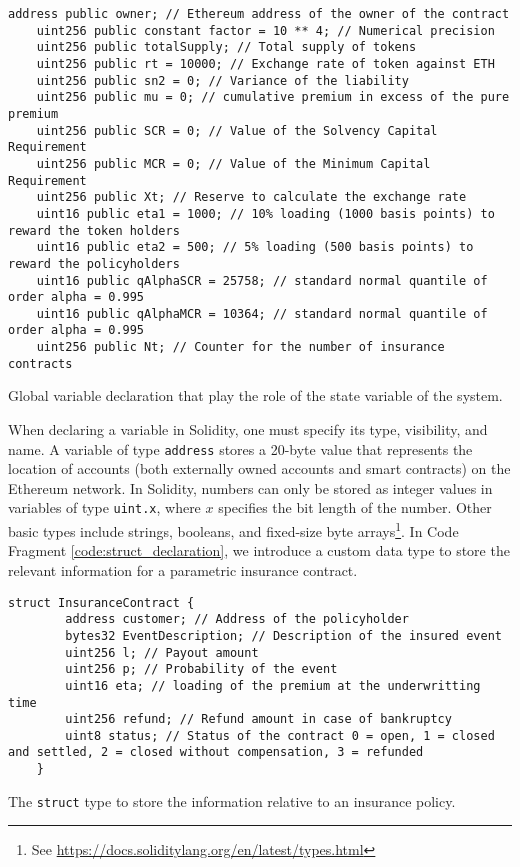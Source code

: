 \documentclass[10pt]{article}
\begin{document}
\begin{codefragment}[!h]
\begin{lstlisting}[language=Solidity]
    address public owner; // Ethereum address of the owner of the contract
    uint256 public constant factor = 10 ** 4; // Numerical precision
    uint256 public totalSupply; // Total supply of tokens
    uint256 public rt = 10000; // Exchange rate of token against ETH
    uint256 public sn2 = 0; // Variance of the liability
    uint256 public mu = 0; // cumulative premium in excess of the pure premium  
    uint256 public SCR = 0; // Value of the Solvency Capital Requirement
    uint256 public MCR = 0; // Value of the Minimum Capital Requirement
    uint256 public Xt; // Reserve to calculate the exchange rate
    uint16 public eta1 = 1000; // 10% loading (1000 basis points) to reward the token holders
    uint16 public eta2 = 500; // 5% loading (500 basis points) to reward the policyholders
    uint16 public qAlphaSCR = 25758; // standard normal quantile of order alpha = 0.995
    uint16 public qAlphaMCR = 10364; // standard normal quantile of order alpha = 0.995
    uint256 public Nt; // Counter for the number of insurance contracts
\end{lstlisting}
    \caption{Global variable declaration that play the role of the state variable of the system.}
    \label{code:variable_declaration}
\end{codefragment}
When declaring a variable in Solidity, one must specify its type, visibility, and name. A variable of type \texttt{address} stores a 20-byte value that represents the location of accounts (both externally owned accounts and smart contracts) on the Ethereum network. In Solidity, numbers can only be stored as integer values in variables of type \texttt{uint.x}, where \(x\) specifies the bit length of the number. Other basic types include strings, booleans, and fixed-size byte arrays\footnote{See \url{https://docs.soliditylang.org/en/latest/types.html}}. In Code Fragment \ref{code:struct_declaration}, we introduce a custom data type to store the relevant information for a parametric insurance contract.
\begin{codefragment}[!h]
\begin{lstlisting}[language=Solidity]
struct InsuranceContract {
        address customer; // Address of the policyholder
        bytes32 EventDescription; // Description of the insured event
        uint256 l; // Payout amount
        uint256 p; // Probability of the event
        uint16 eta; // loading of the premium at the underwritting time
        uint256 refund; // Refund amount in case of bankruptcy
        uint8 status; // Status of the contract 0 = open, 1 = closed and settled, 2 = closed without compensation, 3 = refunded
    }
\end{lstlisting}
    \caption{The \texttt{struct} type to store the information relative to an insurance policy.}
    \label{code:struct_declaration}
\end{codefragment}
\end{document}

